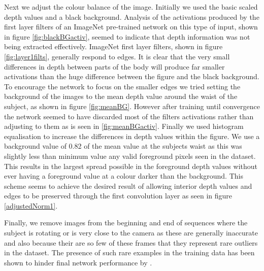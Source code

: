 \documentclass[11pt]{article} %
\begin{document}
Next we adjust the colour balance of the image. Initially we used the basic scaled depth values and a black background. Analysis of the activations produced by the first layer filters of an ImageNet pre-trained network on this type of input, shown in figure \ref{fig:blackBGactiv}, seemed to indicate that depth information was not being extracted effectively. ImageNet first layer filters, shown in figure \ref{fig:layer1filts}, generally respond to edges. It is clear that the very small differences in depth between parts of the body will produce far smaller activations than the huge difference between the figure and the black background. To encourage the network to focus on the smaller edges we tried setting the background of the images to the mean depth value around the waist of the subject, as shown in figure \ref{fig:meanBG}. However after training until convergence the network seemed to have discarded most of the filters activations rather than adjusting to them as is seen in \ref{fig:meanBGactiv}. Finally we used histogram equalisation to increase the differences in depth values within the figure. We use a background value of 0.82 of the mean value at the subjects waist as this was slightly less than minimum value any valid foreground pixels seen in the dataset. This results in the largest spread possible in the foreground depth values without ever having a foreground value at a colour darker than the background. This scheme seems to achieve the desired result of allowing interior depth values and edges to be preserved through the first convolution layer as seen in figure \ref{adjustedNorm1}.

Finally, we remove images from the beginning and end of sequences where the subject is rotating or is very close to the camera as these are generally inaccurate and also because their are so few of these frames that they represent rare outliers in the dataset. The presence of such rare examples in the training data has been shown to hinder final network performance by \cite{Belagiannis}. 
\end{document}
